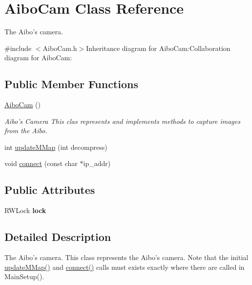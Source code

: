 \hypertarget{classAiboCam}{
\section{AiboCam Class Reference}
\label{classAiboCam}
}


The Aibo's camera.  


{\ttfamily \#include $<$AiboCam.h$>$}Inheritance diagram for AiboCam:Collaboration diagram for AiboCam:\subsection*{Public Member Functions}
\begin{DoxyCompactItemize}
\item 
\hypertarget{classAiboCam_a594411a1df57552aa2b9c609319c74d4}{
\hyperlink{classAiboCam_a594411a1df57552aa2b9c609319c74d4}{AiboCam} ()}
\label{classAiboCam_a594411a1df57552aa2b9c609319c74d4}

\begin{DoxyCompactList}\small\item\em Aibo's Camera This clas represents and implements methods to capture images from the Aibo. \item\end{DoxyCompactList}\item 
int \hyperlink{classAiboCam_a72162af9d25b9b24d6449d41b234f8b2}{updateMMap} (int decompress)
\item 
void \hyperlink{classAiboCam_aa450f46c7d0bfc09ec6f6b16cb42fdc6}{connect} (const char $\ast$ip\_\-addr)
\end{DoxyCompactItemize}
\subsection*{Public Attributes}
\begin{DoxyCompactItemize}
\item 
\hypertarget{classAiboCam_aa865c8168614456624bdea87b5cd8a71}{
RWLock {\bfseries lock}}
\label{classAiboCam_aa865c8168614456624bdea87b5cd8a71}

\end{DoxyCompactItemize}


\subsection{Detailed Description}
The Aibo's camera. This class represents the Aibo's camera. Note that the initial \hyperlink{classAiboCam_a72162af9d25b9b24d6449d41b234f8b2}{updateMMap()} and \hyperlink{classAiboCam_aa450f46c7d0bfc09ec6f6b16cb42fdc6}{connect()} calls must exists exactly where there are called in MainSetup(). 

